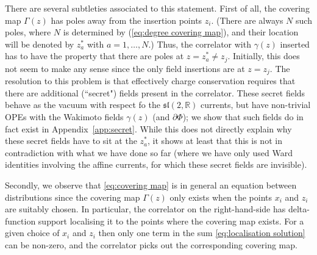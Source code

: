 \documentclass[12pt,a4paper]{article}
\begin{document}
There are several subtleties associated to this statement. First of all, the covering map $\Gamma(z)$ has poles away from the insertion points $z_i$. (There are always $N$ such poles,  where $N$ is determined by (\ref{eq:degree covering map}), and their location will  be denoted by $z_a^*$ with $a=1,\ldots, N$.) Thus, the correlator with $\gamma(z)$ inserted has to have the property that there are poles at  $z=z_a^*\neq z_j$. Initially, this does not seem to make any sense since the only field insertions are at $z=z_j$. 
The resolution to this problem is that effectively charge conservation requires that there are additional (``secret") fields present in the correlator. These secret fields behave as the vacuum with respect fo the $\mathfrak{sl}(2,\mathds{R})$ currents, but have non-trivial OPEs with the Wakimoto fields $\gamma(z)$ (and $\partial\Phi$); we show that such fields do in fact exist in Appendix~\ref{app:secret}. While this does not directly explain why these secret fields have to sit at the $z_a^*$, it shows at least that this is not in contradiction with what we have done so far (where we have only used Ward identities involving the affine currents, for which these secret fields are invisible). 

Secondly, we observe that \eqref{eq:covering map} is in general an equation between distributions since the covering map $\Gamma(z)$ only exists when the points $x_i$ and $z_i$ are suitably chosen. In particular, the correlator on the right-hand-side has delta-function support localising it to the points where the covering map exists. For a given choice of $x_i$ and $z_i$ then only one term in the sum \eqref{eq:localisation solution} can be non-zero, and the correlator picks out the corresponding covering map.
\smallskip
\end{document}
